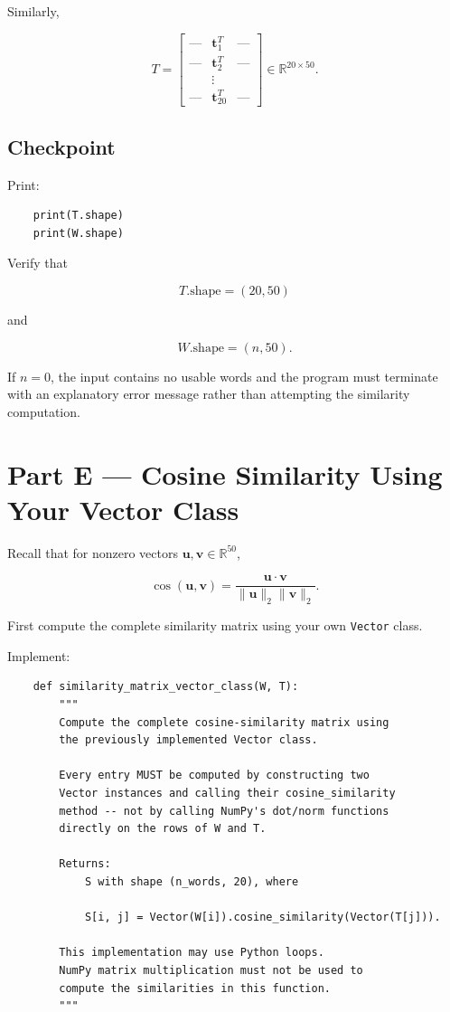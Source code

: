 \documentclass[12pt]{article}
\begin{document}
Similarly,

\[
T =
\begin{bmatrix}
\text{---} & \mathbf{t}_1^T & \text{---}\\
\text{---} & \mathbf{t}_2^T & \text{---}\\
    & \vdots          &    \\
\text{---} & \mathbf{t}_{20}^T & \text{---}
\end{bmatrix}
\in \mathbb{R}^{20\times 50}.
\]

\subsection*{Checkpoint}

Print:
\begin{lstlisting}
    print(T.shape)
    print(W.shape)
\end{lstlisting}

Verify that

\[
T.\mathrm{shape}=(20,50)
\]

and

\[
W.\mathrm{shape}=(n,50).
\]

If \(n=0\), the input contains no usable words and the program must
terminate with an explanatory error message rather than attempting
the similarity computation.

\section*{Part E --- Cosine Similarity Using Your Vector Class}

Recall that for nonzero vectors
\(\mathbf{u},\mathbf{v}\in\mathbb{R}^{50}\),

\[
\cos(\mathbf{u},\mathbf{v})
=
\frac{\mathbf{u}\cdot\mathbf{v}}
{\|\mathbf{u}\|_2\|\mathbf{v}\|_2}.
\]

First compute the complete similarity matrix using your own
\texttt{Vector} class.

Implement:

\begin{lstlisting}
    def similarity_matrix_vector_class(W, T):
        """
        Compute the complete cosine-similarity matrix using
        the previously implemented Vector class.

        Every entry MUST be computed by constructing two
        Vector instances and calling their cosine_similarity
        method -- not by calling NumPy's dot/norm functions
        directly on the rows of W and T.

        Returns:
            S with shape (n_words, 20), where

            S[i, j] = Vector(W[i]).cosine_similarity(Vector(T[j])).

        This implementation may use Python loops.
        NumPy matrix multiplication must not be used to
        compute the similarities in this function.
        """
\end{lstlisting}
\end{document}
